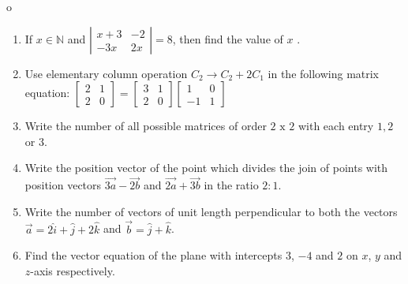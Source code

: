 o\documentclass[a4paper,12pt]{article}
\begin{document}
\begin{enumerate}[label=\textbf{\arabic*.}]
	\item If $x \in \mathbb{N}$ and
		$	
		\left|
		\begin{array}{cc}x + 3 & -2 \\-3x & 2x
		\end{array}
		\right| = 8
		$, \quad then find the value of $x$ .
	\vspace{0.5em}
	\item Use elementary column operation $C_2		\rightarrow C_2 + 2C_1$ in the following matrix equation:
		$ 
		\begin{bmatrix}
			2 & 1 \\2 & 0 
		\end{bmatrix}
		=
		\begin{bmatrix}
			3 & 1 \\2 & 0
		\end{bmatrix}
		\begin{bmatrix}
			1 & 0 \\-1 & 1
		\end{bmatrix}
		$
	\vspace{0.5em}
	\item Write the number of all possible matrices of order $2 \text{ x } 2$ with each entry $1, 2$ or $3$.
	\vspace{0.5em}
	\item Write the position vector of the point which divides the join of points with position vectors $\vec{3a}- \vec{2b}$ and $\vec{2a} + \vec{3b}$ in the ratio $2 : 1$.
	\vspace{0.5em}
	\item Write the number of vectors of unit length perpendicular to both the vectors  $\vec{a} = 2\hat{i} + \hat{j} + 2\hat{k}$ and $\vec{b} = \hat{j} + \hat{k}$.
	\vspace{0.5em}
	\item Find the vector equation of the plane with intercepts $3$, $-4$ and $2$ on $x$, $y$ and $z$-axis respectively.
	\vspace{0.5em}
\newpage
\thispagestyle{plain}
\begin{center}

\end{center}
\end{enumerate}
\end{document}
